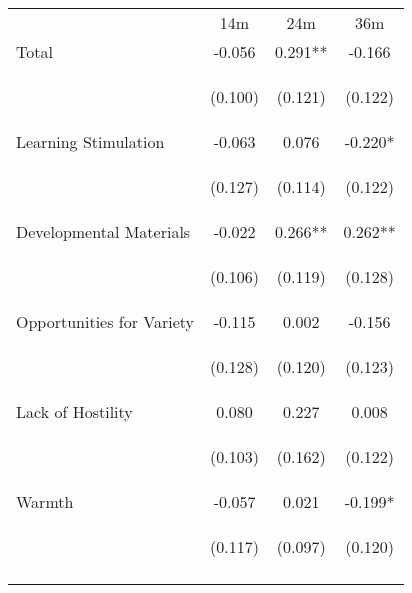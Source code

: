 \begin{tabular}{lccc}
\hline \noalign{\smallskip} & 14m & 24m & 36m\\
\noalign{\smallskip}\hline \noalign{\smallskip}Total & -0.056 & 0.291** & -0.166\\
 & \begin{footnotesize}(0.100)\end{footnotesize} & \begin{footnotesize}(0.121)\end{footnotesize} & \begin{footnotesize}(0.122)\end{footnotesize}\\
\noalign{\smallskip}Learning Stimulation & -0.063 & 0.076 & -0.220*\\
 & \begin{footnotesize}(0.127)\end{footnotesize} & \begin{footnotesize}(0.114)\end{footnotesize} & \begin{footnotesize}(0.122)\end{footnotesize}\\
\noalign{\smallskip}Developmental Materials & -0.022 & 0.266** & 0.262**\\
 & \begin{footnotesize}(0.106)\end{footnotesize} & \begin{footnotesize}(0.119)\end{footnotesize} & \begin{footnotesize}(0.128)\end{footnotesize}\\
\noalign{\smallskip}Opportunities for Variety & -0.115 & 0.002 & -0.156\\
 & \begin{footnotesize}(0.128)\end{footnotesize} & \begin{footnotesize}(0.120)\end{footnotesize} & \begin{footnotesize}(0.123)\end{footnotesize}\\
\noalign{\smallskip}Lack of Hostility & 0.080 & 0.227 & 0.008\\
 & \begin{footnotesize}(0.103)\end{footnotesize} & \begin{footnotesize}(0.162)\end{footnotesize} & \begin{footnotesize}(0.122)\end{footnotesize}\\
\noalign{\smallskip}Warmth & -0.057 & 0.021 & -0.199*\\
 & \begin{footnotesize}(0.117)\end{footnotesize} & \begin{footnotesize}(0.097)\end{footnotesize} & \begin{footnotesize}(0.120)\end{footnotesize}\\
\noalign{\smallskip}\hline\end{tabular}\\
